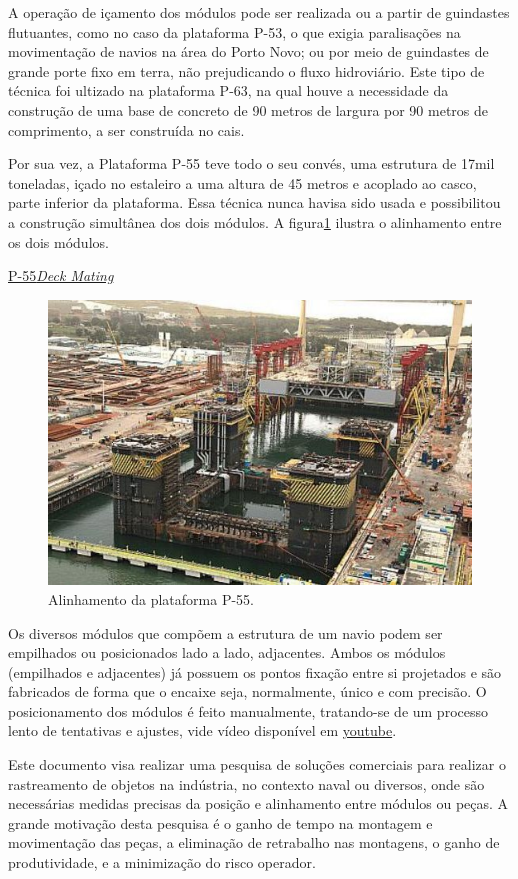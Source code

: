 A operação de içamento dos módulos pode ser realizada ou a partir de guindastes
flutuantes, como no caso da plataforma P-53, o que exigia paralisações 
na movimentação de navios na área do Porto Novo; ou por meio de guindastes de
grande porte fixo em terra, não prejudicando o fluxo hidroviário. Este tipo de
técnica foi ultizado na plataforma P-63, na qual houve a necessidade da
construção de uma base de concreto de 90 metros de largura por 90 metros de
comprimento, a ser construída no cais.

Por sua vez, a Plataforma P-55 teve todo o seu convés, uma estrutura de 17mil
toneladas, içado no estaleiro a uma altura de 45 metros e acoplado ao casco,
parte inferior da plataforma. Essa técnica nunca havisa sido usada e
possibilitou a construção simultânea dos dois módulos. A figura\ref{P55} ilustra
o alinhamento entre os dois módulos.

\href{http://www.offshoreenergytoday.com/brazils-petrobras-completes-deck-mating-on-p-55-platform/}{P-55\textit{Deck
Mating}}

\begin{figure}[h!]
    \centering
    \includegraphics[width=0.9\columnwidth]{figs/mating/P55}
    \caption{Alinhamento da plataforma P-55.}
    \label{P55}
\end{figure} 

Os diversos módulos que compõem a estrutura de um navio podem ser empilhados ou
posicionados lado a lado, adjacentes. Ambos os módulos (empilhados
e adjacentes) já possuem os pontos fixação entre si projetados e são fabricados
de forma que o encaixe seja, normalmente, único e com precisão. O posicionamento
dos módulos é feito manualmente, tratando-se de um processo lento de tentativas
e ajustes, vide vídeo disponível em
\href{https://www.youtube.com/watch?v=7tMe5vyGP90}{youtube}.

Este documento visa realizar uma pesquisa de soluções comerciais para realizar o
rastreamento de objetos na indústria, no contexto naval ou diversos, onde
são necessárias medidas precisas da posição e alinhamento entre módulos ou
peças. A grande motivação desta pesquisa é o ganho de tempo na montagem e
movimentação das peças, a eliminação de retrabalho nas montagens, o ganho de produtividade, e a minimização do risco operador.

